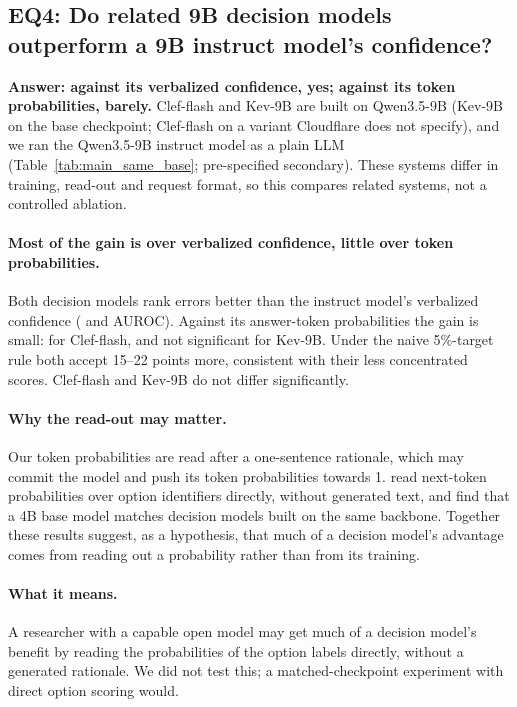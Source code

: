 \FloatBarrier
\subsection{EQ4: Do related 9B decision models outperform a 9B instruct model's confidence?}
\label{sec:eq4}



\textbf{Answer: against its verbalized confidence, yes; against its token probabilities, barely.} Clef-flash and Kev-9B are
built on Qwen3.5-9B (Kev-9B on the base checkpoint; Clef-flash on a variant Cloudflare does not specify), and we ran the
Qwen3.5-9B instruct model as a plain LLM (Table~\ref{tab:main_same_base}; pre-specified secondary). These systems differ in
training, read-out and request format, so this compares related systems, not a controlled ablation.

\paragraph{Most of the gain is over verbalized confidence, little over token probabilities.} Both decision models rank errors better than the instruct
model's verbalized confidence ( and 
AUROC). Against its answer-token probabilities the gain is small:  for
Clef-flash, and not significant for Kev-9B. Under the naive 5\%-target rule both accept 15--22 points more, consistent with
their less concentrated scores. Clef-flash and Kev-9B do not differ significantly.

\paragraph{Why the read-out may matter.} Our token probabilities are read after a one-sentence rationale, which may commit
the model and push its token probabilities towards 1. \citet{li2026llmasjev} read next-token probabilities over option
identifiers directly, without generated text, and find that a 4B base model matches decision models built on the same
backbone. Together these results suggest, as a hypothesis, that much of a decision model's advantage comes from reading out a
probability rather than from its training.

\paragraph{What it means.} A researcher with a capable open model may get much of a decision model's benefit by reading the
probabilities of the option labels directly, without a generated rationale. We did not test this; a matched-checkpoint
experiment with direct option scoring would.

